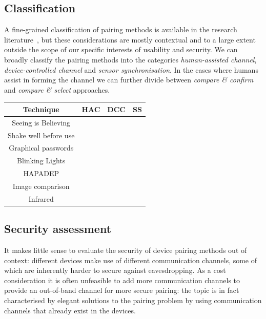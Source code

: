 \documentclass[conference, 11pt]{sty/IEEEtran}
\begin{document}
\subsection{Classification}
A fine-grained classification of pairing methods is available in the research literature~\cite{chong2012usability}, but these considerations are mostly contextual and to a large extent outside the scope of our specific interests of usability and security.
We can broadly classify the pairing methods into the categories \emph{human-assisted channel}, \emph{device-controlled channel} and \emph{sensor synchronisation}.
In the cases where humans assist in forming the channel we can further divide between \textit{compare \& confirm} and \textit{compare \& select} approaches.

\begin{tabular}{c|c|c|c}
	Technique & HAC & DCC & SS \\
	\hline
	  Seeing is Believing &  & \checkmark &   \\
	Shake well before use &  &  & \checkmark \\
    	  Graphical passwords & \checkmark &  &  \\
	   Blinking Lights & \checkmark &  & \\
	 HAPADEP &  & \checkmark & \checkmark \\
	Image comparison & \checkmark &  & \\
	Infrared &  & \checkmark &  \\
\end{tabular}

\subsection{Security assessment}
\label{ssec:security_assessment}

It makes little sense to evaluate the security of device pairing methods out of context: different devices make use of different communication channels, some of which are inherently harder to secure against eavesdropping.
As a cost consideration it is often unfeasible to add more communication channels to provide an out-of-band channel for more secure pairing: the topic is in fact characterised by elegant solutions to the pairing problem by using communication channels that already exist in the devices.
\end{document}
